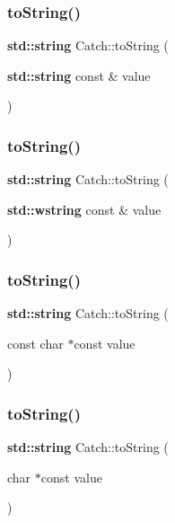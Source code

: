 \subsubsection{\texorpdfstring{to\+String()}{toString()}\hspace{0.1cm}{\footnotesize\ttfamily [2/17]}}
{\footnotesize\ttfamily \textbf{ std\+::string} Catch\+::to\+String (\begin{DoxyParamCaption}\item[{\textbf{ std\+::string} const \&}]{value }\end{DoxyParamCaption})}

\mbox{\label{namespace_catch_af9fc40701e3a7d0790866e7cf8c0279f}} 
\subsubsection{\texorpdfstring{to\+String()}{toString()}\hspace{0.1cm}{\footnotesize\ttfamily [3/17]}}
{\footnotesize\ttfamily \textbf{ std\+::string} Catch\+::to\+String (\begin{DoxyParamCaption}\item[{\textbf{ std\+::wstring} const \&}]{value }\end{DoxyParamCaption})}

\mbox{\label{namespace_catch_ace2e2fe33b196bc8278f605dcb72e38d}} 
\subsubsection{\texorpdfstring{to\+String()}{toString()}\hspace{0.1cm}{\footnotesize\ttfamily [4/17]}}
{\footnotesize\ttfamily \textbf{ std\+::string} Catch\+::to\+String (\begin{DoxyParamCaption}\item[{const char $\ast$const}]{value }\end{DoxyParamCaption})}

\mbox{\label{namespace_catch_ae6c2bc95517444d8df8199bd3f61609b}} 
\subsubsection{\texorpdfstring{to\+String()}{toString()}\hspace{0.1cm}{\footnotesize\ttfamily [5/17]}}
{\footnotesize\ttfamily \textbf{ std\+::string} Catch\+::to\+String (\begin{DoxyParamCaption}\item[{char $\ast$const}]{value }\end{DoxyParamCaption})}

